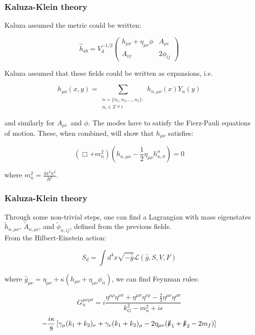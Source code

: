 \documentclass[10pt]{beamer}
\begin{document}
	\begin{frame}
		\frametitle{Kaluza-Klein theory}
		Kaluza assumed the metric could be written:
		
		\begin{equation}
			\hat{h}_{ab} = 
			V_d^{-1/2}\begin{pmatrix}
			h_{\mu\nu} + \eta_{\mu\nu}\phi & A_{\mu i}\\
			A_{\nu j} & 2\phi_{ij}
			\end{pmatrix}
		\end{equation}
		
		Kaluza assumed that these fields could be written as expansions, i.e.
		
		\begin{equation}
			h_{\mu\nu}(x,y) = \sum_{\substack{n=\{n_1,n_2,\ldots,n_5\}; \\ n_i\in\mathbb{Z}\:\forall\:i}} h_{n,\mu\nu}(x)Y_n(y)
		\end{equation}
		
		and similarly for $A_{\mu i}$ and $\phi$. The modes have to satisfy the Fierz-Pauli equations of motion. These, when combined, will show that $h_{\mu\nu}$ satisfies:
		
		\begin{equation}
			(\Box + m_n^2)(h_{n,\mu\nu}-\frac{1}{2}\eta_{\mu\nu}h_{n,\sigma}^\sigma) = 0 
		\end{equation}
		
		where $m_n^2 = \frac{4\pi^2 n^2}{R^2}$.
	\end{frame}
	
	\begin{frame}
		\frametitle{Kaluza-Klein theory}
		Through some non-trivial steps, one can find a Lagrangian with mass eigenstates $\tilde{h}_{n,\mu\nu}$, $\tilde{A}_{n,\mu i}$, and $\tilde{\phi}_{n,ij}$, defined from the previous fields.\\
		
		From the Hilbert-Einstein action:
		
		\begin{equation}
			S_d = \int d^4x \sqrt{-\hat{g}}\mathcal{L}(\hat{g},S,V,F)
		\end{equation}
		
		where $\hat{g}_{\mu\nu} = \eta_{\mu\nu} + \kappa(h_{\mu\nu} + \eta_{\mu\nu}\phi_{ii})$, we can find Feynman rules:
		
		\begin{equation}
			G_n^{\mu\nu\rho\sigma} = i\frac{\eta^{\mu\rho}\eta^{\nu\sigma} + \eta^{\mu\sigma}\eta^{\nu\rho} - \frac{2}{3}\eta^{\mu\nu}\eta^{\rho\sigma}}{k_G^2 - m_n^2 + i\epsilon}
		\end{equation}
		\begin{equation}
			-\frac{i\kappa}{8}\left[\gamma_\mu(k_1 + k_2)_ \nu + \gamma_\nu(k_1+k_2)_\mu - 2\eta_{\mu\nu}(\slashed k_1 + \slashed k_2 - 2m_f)\right]
		\end{equation}
		
	\end{frame}
	
\end{document}
